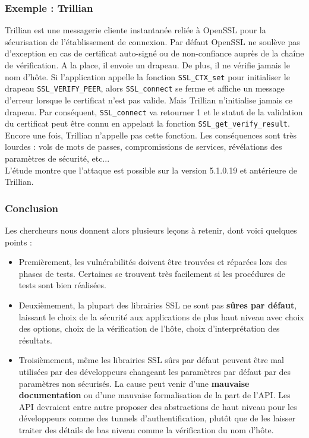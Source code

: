 		\subsubsection{Exemple : Trillian}

			Trillian est une messagerie cliente instantanée	reliée à OpenSSL pour la sécurisation de l'établissement de connexion. Par défaut OpenSSL ne soulève pas d'exception en cas de certificat auto-signé ou de non-confiance auprès de la chaîne de vérification. A la place, il envoie un drapeau. De plus, il ne vérifie jamais le nom d'hôte.	Si l'application appelle la fonction \texttt{SSL\_CTX\_set} pour initialiser le drapeau \texttt{SSL\_VERIFY\_PEER}, alors \texttt{SSL\_connect} se ferme et affiche un message d'erreur lorsque le certificat n'est pas valide.	Mais Trillian n'initialise jamais ce drapeau.	Par conséquent, \texttt{SSL\_connect} va retourner 1 et le statut de la validation du certificat peut être connu en appelant la fonction \texttt{SSL\_get\_verify\_result}.	Encore une fois, Trillian n'appelle pas cette fonction.	Les conséquences sont très lourdes : vols de mots de passes, compromissions de services, révélations des paramètres de sécurité, etc...\\
			

			L'étude montre que l'attaque est possible sur la version 5.1.0.19 et antérieure de Trillian.

		\subsubsection{Conclusion}

			Les chercheurs nous donnent alors plusieurs leçons à retenir, dont voici quelques points :
			\begin{itemize}
			\item Premièrement, les vulnérabilités doivent être trouvées et réparées lors des phases de tests. Certaines se trouvent très facilement si les procédures de tests sont bien réalisées. 
			\item Deuxièmement, la plupart des librairies SSL ne sont pas \textbf{sûres par défaut}, laissant le choix de la sécurité aux applications de plus haut niveau avec choix des options, choix de la vérification de l'hôte, choix d'interprétation des résultats.
			\item Troisièmement, même les librairies SSL sûrs par défaut peuvent être mal utilisées par des développeurs changeant les paramètres par défaut par des paramètres non sécurisés. La cause peut venir d'une \textbf{mauvaise documentation} ou d'une mauvaise formalisation de la part de l'API. Les API devraient entre autre proposer des abstractions de haut niveau pour les développeurs comme des tunnels d'authentification, plutôt que de les laisser traiter des détails de bas niveau comme la vérification du nom d'hôte.\\
			\end{itemize}

